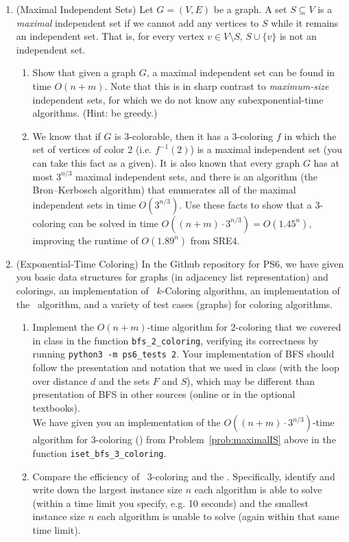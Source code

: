 \documentclass[11pt]{article}
\begin{document}
\begin{enumerate}
 \item (Maximal Independent Sets) \label{prob:maximalIS} Let $G=(V,E)$ be a graph.  A set $S\subseteq V$ is a {\em maximal} independent set if we cannot add any vertices to $S$ while it remains an independent set.  That is, for every vertex $v\in V\setminus S$, $S\cup\{v\}$ is not an independent set.
    \begin{enumerate}
        \item Show that given a graph $G$, a maximal independent set can be found in time $O(n+m)$.  Note that this is in sharp contrast to {\em maximum-size} independent sets, for which we do not know any subexponential-time algorithms. (Hint: be greedy.)\\

    \item We know that if $G$ is 3-colorable, then it has a 3-coloring $f$ in which the set of vertices of color 2 (i.e. $f^{-1}(2)$) is a maximal independent set (you can take this fact as a given). It is also known that every graph $G$ has at most $3^{n/3}$ maximal independent sets, and there is an algorithm (the Bron--Kerbosch algorithm) that enumerates all of the maximal independent sets in time $O(3^{n/3}).$  Use these facts to show that a 3-coloring can be solved in time $O((n+m)\cdot 3^{n/3}) = O(1.45^n),$ improving the runtime of $O(1.89^n)$ from SRE4. \\

    \end{enumerate}
\item (Exponential-Time Coloring)
  In the Github repository for PS6, we have given you basic data structures for graphs (in adjacency list representation) and colorings, an implementation of \ExhaustiveSearch\ $k$-Coloring algorithm,
  an implementation of the \BronKerbosch\ algorithm, and
    a variety of test cases (graphs) for coloring algorithms.
  \begin{enumerate}
      \item Implement the $O(n+m)$-time algorithm for 2-coloring that we covered in class in the function \texttt{bfs\_2\_coloring}, verifying its correctness by running \texttt{python3 -m ps6\_tests 2}.
        Your implementation of BFS should follow the presentation and notation that we used in class (with the loop over distance $d$ and the sets $F$ and $S$), which may be different than presentation of BFS in other sources (online or in the optional textbooks). \\

We have given you an implementation of the $O((n+m)\cdot 3^{n/3})$-time algorithm for 3-coloring (\MaximalISColoring) from Problem~\ref{prob:maximalIS} above in the function \texttt{iset\_bfs\_3\_coloring}.
\label{part:TbT}
    \item
    Compare the efficiency of \ExhaustiveSearch\ 3-coloring and the \MaximalISColoring. Specifically, identify and write down the largest instance size $n$ each algorithm is able to solve (within a time limit you specify,
    e.g. 10 seconds) and the smallest instance size $n$ each algorithm is unable to solve (again within that same time limit). \\


\end{enumerate}
\end{enumerate}
\end{document}
